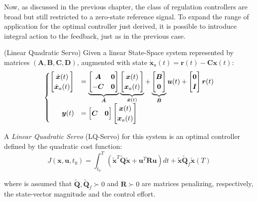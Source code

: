 \documentclass[a4paper,11pt]{book}
\numberwithin{figure}{chapter}
\numberwithin{equation}{chapter}
\numberwithin{table}{chapter}
\theoremstyle{definition}
\newtheorem{definition}{Definition}[chapter]
\newcounter{boxed-theorem}
\newcounter{boxed-definition}
\newenvironment{boxed-definition}[1]
{\begin{shaded} \begin{definition}{#1}}
{\end{definition} \end{shaded}}
\begin{document}
Now, as discussed in the previous chapter, the class of regulation controllers are broad but still restricted to a zero-state reference signal. To expand the range of application for the optimal controller just derived, it is possible to introduce integral action to the feedback, just as in the previous case.

\begin{boxed-definition}{(Linear Quadratic Servo)} \label{def:lqr}
	Given a linear State-Space system represented by matrices $(\bm{A}, \bm{B}, \bm{C}, \bm{D})$, augmented with state $\dot{\bm{x}}_a(t) = \bm{r}(t) - \bm{C} \bm{x}(t)$:
	\begin{align} 
	\begin{cases}
		\begin{bmatrix}
			\dot{\bm{x}}(t) \\
			\dot{\bm{x}}_a(t)
		\end{bmatrix} &= \underbrace{\begin{bmatrix}
			\bm{A}  & \bm{0} \\ - \bm{C} & \bm{0}
		\end{bmatrix}}_{\tilde{\bm{A}}} \underbrace{\begin{bmatrix}
			\bm{x}(t) \\
			\bm{x}_a(t)
		\end{bmatrix}}_{\tilde{\bm{x}}(t)} + \underbrace{\begin{bmatrix}
			\bm{B} \\
			\bm{0}
		\end{bmatrix}}_{\tilde{\bm{B}}} \bm{u}(t) + \begin{bmatrix}
			\bm{0} \\
			\bm{I}
		\end{bmatrix} \bm{r}(t)
		\\
		\hfill \bm{y}(t) &= \begin{bmatrix}
			\bm{C} & \bm{0}
		\end{bmatrix} \begin{bmatrix}
			\bm{x}(t) \\
			\bm{x}_a(t)
		\end{bmatrix}
	\end{cases}
	\end{align}
	
	A \textit{Linear Quadratic Servo} (LQ-Servo) for this system is an optimal controller defined by the quadratic cost function:
	\begin{equation}
		J(\bm{x}, \bm{u}, t_0) = \int_{t_0}^{T} \left( \tilde{\bm{x}}^T \tilde{\bm{Q}} \tilde{\bm{x}} + \bm{u}^T \bm{R} \bm{u} \right) dt +\tilde{\bm{x}} \tilde{\bm{Q}}_f \tilde{\bm{x}}(T)
	\end{equation}
	
	\noindent where is assumed that $\tilde{\bm{Q}}, \tilde{\bm{Q}}_f \succ 0$ and $\bm{R} \succ 0$ are matrices penalizing, respectively, the state-vector magnitude and the control effort.
\end{boxed-definition}
\end{document}
